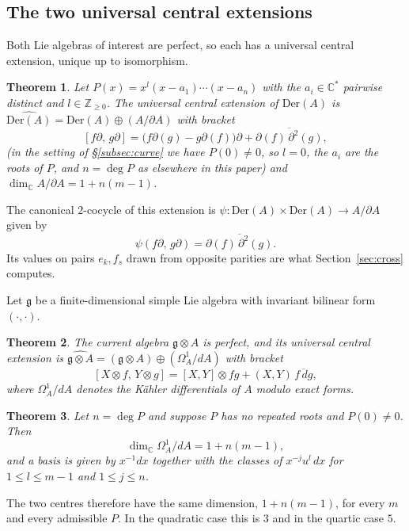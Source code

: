 \documentclass[11pt]{amsart}
\newtheorem{theorem}{Theorem}[section]
\theoremstyle{definition}
\theoremstyle{remark}
\newcommand{\C}{\mathbb{C}}
\newcommand{\Z}{\mathbb{Z}}
\newcommand{\g}{\mathfrak{g}}
\newcommand{\Der}{\mathrm{Der}}
\newcommand{\pa}{\partial}
\newcommand{\hDer}{\widehat{\Der(A)}}
\newcommand{\hg}{\widehat{\g\otimes A}}
\newcommand{\ox}{\otimes}
\newcommand{\ol}[1]{\overline{#1}}
\begin{document}
\subsection{The two universal central extensions}

Both Lie algebras of interest are perfect, so each has a universal central
extension, unique up to isomorphism.

\begin{theorem}\label{thm:UCE_Der}
{\rm\cite[Theorem~9]{CoxGuoLuZhao2017}}
Let $P(x)=x^{l}(x-a_1)\cdots(x-a_n)$ with the $a_i\in\C^{*}$ pairwise
distinct and $l\in\Z_{\geq0}$. The universal central extension of $\Der(A)$ is
$\hDer=\Der(A)\oplus(A/\pa A)$ with bracket
\[
  [f\pa,\,g\pa] = \bigl(f\pa(g)-g\pa(f)\bigr)\pa + \ol{\pa(f)\,\pa^2(g)},
\]
(in the setting of \S\ref{subsec:curve} we have $P(0)\neq0$, so $l=0$, the
$a_i$ are the roots of $P$, and $n=\deg P$ as elsewhere in this paper)
and $\dim_\C A/\pa A = 1+n(m-1)$.
\end{theorem}

The canonical $2$-cocycle of this extension is
$\psi\colon\Der(A)\times\Der(A)\to A/\pa A$ given by
\begin{equation}\label{eq:psi_def}
  \psi(f\pa,\,g\pa) = \ol{\pa(f)\,\pa^2(g)} .
\end{equation}
Its values on pairs $e_k,f_s$ drawn from opposite parities are what
Section~\ref{sec:cross} computes.

Let $\g$ be a finite-dimensional simple Lie algebra with invariant bilinear
form $(\cdot,\cdot)$.

\begin{theorem}\label{thm:UCE_gA}
{\rm\cite{KasselLoday1982}}
The current algebra $\g\otimes A$ is perfect, and its universal central
extension is $\hg=(\g\otimes A)\oplus(\Omega^1_A/dA)$ with bracket
\[
  [X\ox f,\,Y\ox g] = [X,Y]\ox fg + (X,Y)\,\ol{f\,dg},
\]
where $\Omega^1_A/dA$ denotes the K\"ahler differentials of $A$ modulo exact
forms.
\end{theorem}

\begin{theorem}\label{thm:SNF_basis}
{\rm\cite[Theorem~2.4]{Santos2022}}
Let $n=\deg P$ and suppose $P$ has no repeated roots and $P(0)\neq0$. Then
\[
  \dim_\C\Omega^1_A/dA = 1+n(m-1),
\]
and a basis is given by $x^{-1}dx$ together with the classes of
$x^{-j}u^l\,dx$ for $1\leq l\leq m-1$ and $1\leq j\leq n$.
\end{theorem}

The two centres therefore have the same dimension, $1+n(m-1)$, for every $m$
and every admissible $P$. In the quadratic case this is $3$ and in the quartic
case $5$.
\end{document}

